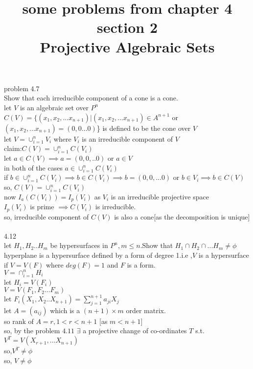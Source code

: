 \documentclass[11pt]{amsart}
\theoremstyle{definition}
\begin{document}
\title{\textbf{some problems from chapter 4  section 2}\\ Projective Algebraic Sets}
\maketitle
problem 4.7\\
Show that each irreducible component of a cone is a cone.\\
let $V$ is an algebraic set over $P^n$\\
$C(V)=\{(x_1,x_2,...x_{n+1})|(x_1,x_2,...x_{n+1})\in A^{n+1}$ or $ (x_1,x_2,...x_{n+1})=(0,0...0)$\}$ $ is defined to be the cone over $V$\\
let $V=\cup_{i=1}^n V_i$ where $V_i$ is an irreducible component of $V$\\
claim:$C(V)=\cup_{i=1}^n C(V_i)$\\
let $a\in C(V)\implies a=(0,0,..0)$ or $a\in V$\\
in both of the cases $a\in \cup_{i=1}^n C(V_i)$\\
if $b\in \cup_{i=1}^n C(V_i)\implies b\in C(V_i)\implies b=(0,0,...0)$ or $b\in V_i\implies b\in C(V)$\\
so, $C(V)=\cup_{i=1}^n C(V_i)$\\
now $I_a(C(V_i))=I_p(V_i)$ as $V_i$ is an irreducible projective space \\
$I_p(V_i)$ is prime $\implies C(V_i)$ is irreducible.\\
so, irreducible component of $C(V)$ is also a cone[as the decomposition is unique]\\\\
4.12\\
let $H_1,H_2..H_m$ be hypersurfaces in $P^n,m\leq n$.Show that $H_1\cap H_2\cap ...H_m\neq \phi$
hyperplane is a hypersurface  defined by a form of degree 1.i.e ,$V$ is a hypersurface if $V=V(F)$ where $deg(F)=1$ and $F$ is a form.\\
$V=\cap_{i=1}^nH_i$\\
let $H_i=V(F_i)$\\
$V=V(F_1,F_2...F_m)$\\
let $F_i(X_1,X_2..X_{n+1})=\sum_{j=1}^{n+1}a_{ji}X_j$\\
let $A=(a_{ij})$ which is a $(n+1)\times m$ order matrix.\\
so rank of $A=r,1<r<n+1$ [as $m<n+1$]\\
so, by the problem $4.11$  $\exists$ a projective change of co-ordinates $T$ s.t.$ V^{T}=V(X_{r+1},...X_{n+1})$\\
so,$V^T\neq \phi$\\
so, $V\neq \phi$\\\\
\end{document}
